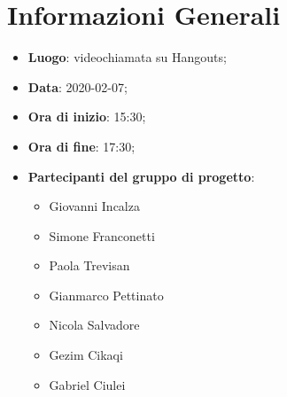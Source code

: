 \section{Informazioni Generali}
	\begin{itemize}
		\item \textbf {Luogo}: videochiamata su Hangouts;
		\item \textbf {Data}: 2020-02-07;
		\item \textbf {Ora di inizio}: 15:30;
		\item \textbf {Ora di fine}: 17:30;
		\item \textbf {Partecipanti del gruppo di progetto}:
			\begin{itemize}
				\item Giovanni Incalza
				\item Simone Franconetti
				\item Paola Trevisan
				\item Gianmarco Pettinato
				\item Nicola Salvadore
				\item Gezim Cikaqi
				\item Gabriel Ciulei
			\end{itemize}
	\end{itemize}